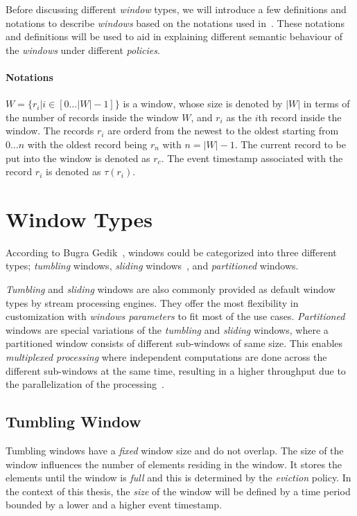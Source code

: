 Before discussing different \emph{window} types, we will introduce a 
few definitions and notations to describe \emph{windows} based 
on the notations used in~\cite{generic_window_sem}. These notations and definitions 
will be used to aid in explaining different semantic behaviour of the \emph{windows} under 
different \emph{policies}. 

\paragraph{Notations}%
$W = \{r_i | i \in [0\dots|W| - 1] \} $ is a window, whose size is denoted by $|W|$ in terms 
of the number of records inside the window $W$, and $r_i$ as the $i$th record inside 
the window. The records $r_i$ are orderd from the newest to the oldest starting from 
$0\dots n$ with the oldest record being $r_n$ with $ n = |W| - 1$. The current record to be put 
into the window is denoted as $r_c$. The event timestamp associated with the
record $r_i$ is denoted as $\tau(r_i)$.

\section{Window Types}

According to Bugra Gedik~\cite{generic_window_sem}, windows could be categorized into 
three different types; \emph{tumbling} windows, 
\emph{sliding} windows~\cite{stream_standford,spade_stream}, and \emph{partitioned} windows.

\emph{Tumbling} and \emph{sliding} windows are also commonly provided as 
 default window types by stream processing engines. 
They offer the most flexibility in customization with \emph{windows parameters} to fit 
most of the use cases.
\emph{Partitioned} windows are special variations of the \emph{tumbling} and
\emph{sliding} windows, where a partitioned window consists of different sub-windows of same size. 
This enables \emph{multiplexed processing} where independent computations are done across the 
different sub-windows at the same time, resulting in a higher throughput due to 
the parallelization of the processing~\cite{generic_window_sem}.

\subsection{Tumbling Window}%
\label{sec:Tumbling Window}
Tumbling windows have a \emph{fixed} window size and do not 
overlap. The size of the window influences 
the number of elements residing in the window. It stores the elements 
until the window is \emph{full} and this is determined by the \emph{eviction} policy. 
In the context of this thesis, the \emph{size} of the window will be defined by 
a time period bounded by a lower and a higher event timestamp. 

